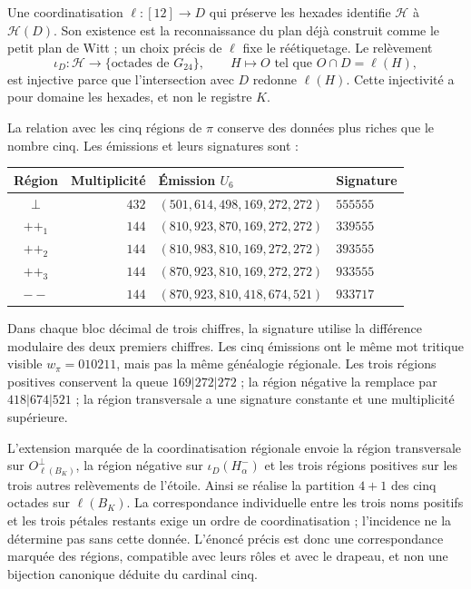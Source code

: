 Une coordinatisation $\ell:[12]\to D$ qui préserve les hexades identifie
$\mathcal H$ à $\mathcal H(D)$. Son existence est la reconnaissance
du plan déjà construit comme le petit plan de Witt ; un choix
précis de $\ell$ fixe le réétiquetage. Le relèvement
\[
 \iota_D:\mathcal H\longrightarrow
       \{\text{octades de }G_{24}\},
 \qquad H\longmapsto O\text{ tel que }O\cap D=\ell(H),
\]
est injective parce que l'intersection avec $D$ redonne $\ell(H)$. Cette injectivité a pour domaine les hexades, et non le registre $K$.

La relation avec les cinq régions de $\pi$ conserve des données plus riches
que le nombre cinq. Les émissions et leurs signatures sont :
\begin{center}
\small
\begin{tabular}{@{}crll@{}}
\toprule
Région & Multiplicité & Émission $U_6$ & Signature \\
\midrule
$\perp$ & $432$ & $(501,614,498,169,272,272)$ & $555555$ \\
$++_1$ & $144$ & $(810,923,870,169,272,272)$ & $339555$ \\
$++_2$ & $144$ & $(810,983,810,169,272,272)$ & $393555$ \\
$++_3$ & $144$ & $(870,923,810,169,272,272)$ & $933555$ \\
$--$ & $144$ & $(870,923,810,418,674,521)$ & $933717$ \\
\bottomrule
\end{tabular}
\end{center}
Dans chaque bloc décimal de trois chiffres, la signature utilise la différence
modulaire des deux premiers chiffres. Les cinq émissions ont le
même mot tritique visible $w_\pi=010211$, mais pas la même
généalogie régionale. Les trois régions positives conservent la queue
$169|272|272$ ; la région négative la remplace par $418|674|521$ ;
la région transversale a une signature constante et une multiplicité supérieure.

L'extension marquée de la coordinatisation régionale envoie la région transversale
sur $O_{\ell(B_K)}^\perp$, la région négative sur $\iota_D(H^-_\alpha)$ et les
trois régions positives sur les trois autres relèvements de l'étoile. Ainsi se
réalise la partition $4+1$ des cinq octades sur $\ell(B_K)$.
La correspondance individuelle entre les trois noms positifs et
les trois pétales restants exige un ordre de coordinatisation ; l'incidence ne la détermine
pas sans cette donnée. L'énoncé précis est donc une
correspondance marquée des régions, compatible avec leurs rôles et avec
le drapeau, et non une bijection canonique déduite du cardinal cinq.

